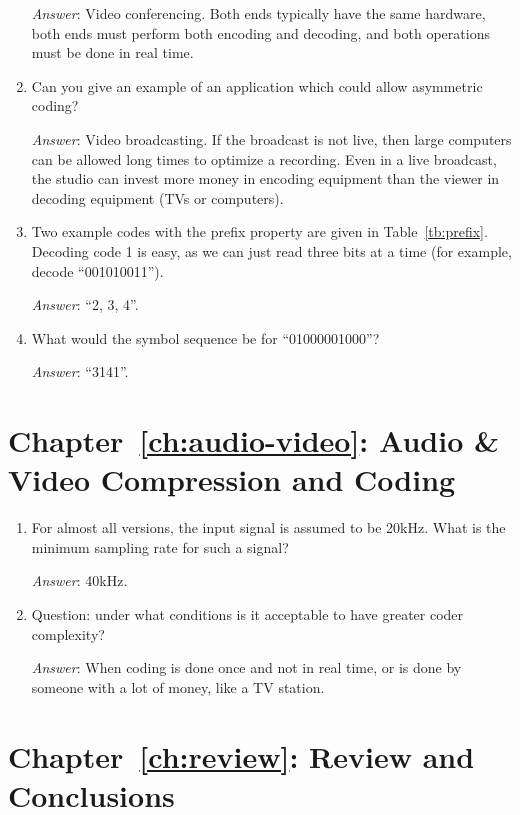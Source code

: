 \begin{enumerate}
  \textit{Answer}: Video conferencing. Both
  ends typically have the same hardware, both ends must perform both
  encoding and decoding, and both operations must be done in real
  time.

\item Can you give an example of an application which could allow
  asymmetric coding?\label{it:ch8ex6}

  \textit{Answer}: Video broadcasting. If the
  broadcast is not live, then large computers can be allowed long times
  to optimize a recording.  Even in a live broadcast, the studio can
  invest more money in encoding equipment than the viewer in decoding
  equipment (TVs or computers).

\item Two example codes with the prefix property are given in
  Table~\ref{tb:prefix}. Decoding code 1 is easy, as we can just read
  three bits at a time (for example, decode
  ``001010011'').\label{it:ch8ex7}

  \textit{Answer}: ``2, 3, 4''.

\item What would the symbol sequence be for
  ``01000001000''?\label{it:ch8ex8}

  \textit{Answer}: ``3141''.

\end{enumerate}


\section{Chapter~\ref{ch:audio-video}: Audio \& Video Compression and Coding}
\label{sc:ch9ex}

\begin{enumerate}

\item For almost all versions, the input signal
  is assumed to be 20kHz. What is the minimum sampling rate for such a
  signal?\label{it:ch9ex1}

  \textit{Answer}: 40kHz.

\item Question: under what conditions is it acceptable to have
  greater coder complexity?\label{it:ch9ex2}

  \textit{Answer}: When coding is done
  once and not in real time, or is done by someone with a lot of money,
  like a TV station.

\end{enumerate}


\section{Chapter~\ref{ch:review}: Review and Conclusions}
\label{sc:ch10ex}

